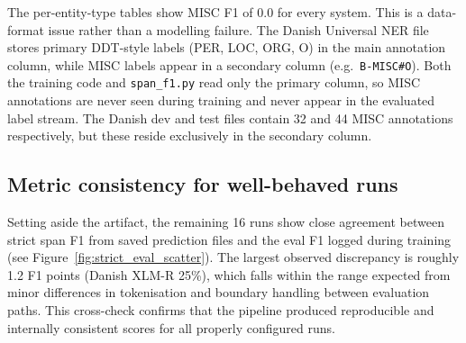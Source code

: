 The per-entity-type tables show MISC F1 of 0.0 for every system. This is a data-format issue rather than a modelling failure. The Danish Universal NER file stores primary DDT-style labels (PER, LOC, ORG, O) in the main annotation column, while MISC labels appear in a secondary column (e.g.\ \texttt{B-MISC\#O}). Both the training code and \texttt{span\_f1.py} read only the primary column, so MISC annotations are never seen during training and never appear in the evaluated label stream. The Danish dev and test files contain 32 and 44 MISC annotations respectively, but these reside exclusively in the secondary column.

\subsection{Metric consistency for well-behaved runs}

Setting aside the artifact, the remaining 16 runs show close agreement between strict span F1 from saved prediction files and the eval F1 logged during training (see Figure~\ref{fig:strict_eval_scatter}). The largest observed discrepancy is roughly 1.2 F1 points (Danish XLM-R 25\%), which falls within the range expected from minor differences in tokenisation and boundary handling between evaluation paths. This cross-check confirms that the pipeline produced reproducible and internally consistent scores for all properly configured runs.
